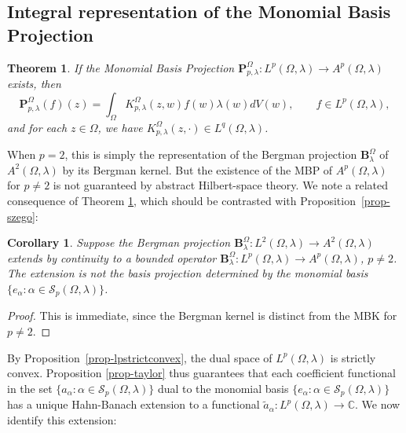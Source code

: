 \documentclass[letterpaper,11pt,reqno]{amsart}
\theoremstyle{plain}
\newtheorem{theorem}[equation]{Theorem}
\newtheorem{corollary}[equation]{Corollary}
\theoremstyle{definition}
\theoremstyle{remark}
\theoremstyle{remark}
\numberwithin{equation}{section}
\newcommand{\wt}{\widetilde}
\newcommand{\cs}{{\mathcal S}}
\newcommand{\C}{{\mathbb C}}
\begin{document}

\subsection{Integral representation of the Monomial Basis Projection}\label{S:Integral-rep-MBP}
\begin{theorem}\label{thm-mbpmbk}
If the Monomial Basis Projection $\bm{P}_{p,\lambda}^\Omega:L^p(\Omega, \lambda)\to A^p(\Omega, \lambda)$ exists, then
\begin{equation}\label{E:def-of-MBP}
\bm{P}_{p,\lambda}^\Omega(f)(z) = \int_\Omega K_{p,\lambda}^\Omega(z,w)f(w)  \lambda(w) dV(w), \qquad f \in L^p(\Omega,\lambda),
\end{equation}
and for each $z\in\Omega$, we have $K_{p,\lambda}^\Omega(z, \cdot)\in L^q(\Omega, \lambda)$.
\end{theorem}

When $p = 2$, this is simply the representation of the Bergman projection $\bm{B}_\lambda^\Omega$ of $A^2(\Omega,\lambda)$ by its Bergman kernel.
But the existence of the MBP of $A^p(\Omega,\lambda)$ for $p \neq 2$ is not guaranteed by abstract Hilbert-space theory. 
We note a related consequence of Theorem \ref{thm-mbpmbk}, which should be contrasted with Proposition~\ref{prop-szego}:

\begin{corollary}\label{cor-bergmannotbasis}
Suppose the Bergman projection $\bm{B}_{\lambda}^\Omega: L^2(\Omega,\lambda)\to A^2(\Omega, \lambda)$ extends by continuity to a bounded operator $\bm{B}_{\lambda}^\Omega: L^p(\Omega, \lambda)\to A^p(\Omega, \lambda)$, $p \neq 2$.
The extension is not the basis projection determined by the monomial  basis $\{e_\alpha:\alpha \in \cs_p(\Omega,\lambda)\}$.
\end{corollary}
\begin{proof}
This is immediate, since the Bergman kernel is distinct from the MBK for $p \neq 2$.
\end{proof}
%
By Proposition~\ref{prop-lpstrictconvex}, the dual space of $L^p(\Omega, \lambda)$ is strictly convex. 
Proposition \ref{prop-taylor} thus guarantees that each coefficient functional in the set $\{a_\alpha: \alpha \in \mathcal{S}_p(\Omega,\lambda)\}$ dual to the monomial  basis $\{e_\alpha: \alpha \in \mathcal{S}_p(\Omega,\lambda)\}$ has a unique Hahn-Banach extension to a functional $\wt{a}_\alpha:L^p(\Omega, \lambda)\to \C$. 
We now identify this extension:
\end{document}
